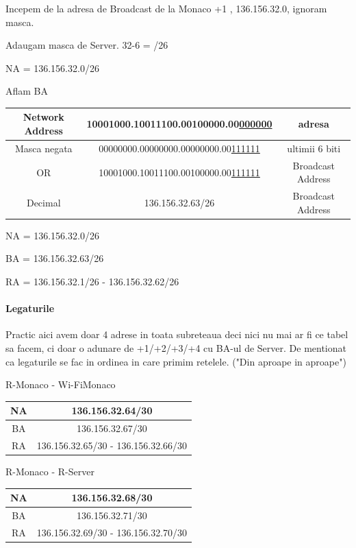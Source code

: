 \documentclass{article}
\begin{document}
Incepem de la adresa de Broadcast de la Monaco +1 , 136.156.32.0, ignoram masca.

Adaugam masca de Server. 32-6 = /26

NA = 136.156.32.0/26

Aflam BA
\begin{center}
   \begin{tabular}{|c|c|c|}
   \hline

      Network Address &  10001000.10011100.00100000.00\underline{000000} & adresa  \\
    \hline
      Masca negata &  00000000.00000000.00000000.00\underline{111111} & ultimii 6 biti \\
    \hline \hline
       OR & 10001000.10011100.00100000.00\underline{111111} & Broadcast Address\\
    \hline
        Decimal & 136.156.32.63/26 &  Broadcast Address\\
    \hline
    \end{tabular}
\end{center}

NA = 136.156.32.0/26

BA = 136.156.32.63/26

RA = 136.156.32.1/26 - 136.156.32.62/26

\newpage
\paragraph{Legaturile}

Practic aici avem doar 4 adrese in toata subreteaua deci nici nu mai ar fi ce tabel sa facem, ci doar o adunare de +1/+2/+3/+4 cu BA-ul de Server. De mentionat ca legaturile se fac in ordinea in care primim retelele. ("Din aproape in aproape")


\begin{center}

    R-Monaco - Wi-FiMonaco


    \begin{tabular}{|c|c|} \hline
         NA & 136.156.32.64/30 \\ \hline
         BA & 136.156.32.67/30\\ \hline
         RA & 136.156.32.65/30 - 136.156.32.66/30 \\ \hline
    \end{tabular}
    


    R-Monaco - R-Server

    \begin{tabular}{|c|c|} \hline
         NA & 136.156.32.68/30 \\ \hline
         BA & 136.156.32.71/30\\ \hline
         RA & 136.156.32.69/30 - 136.156.32.70/30 \\ \hline
    \end{tabular}

\end{center}
\end{document}
